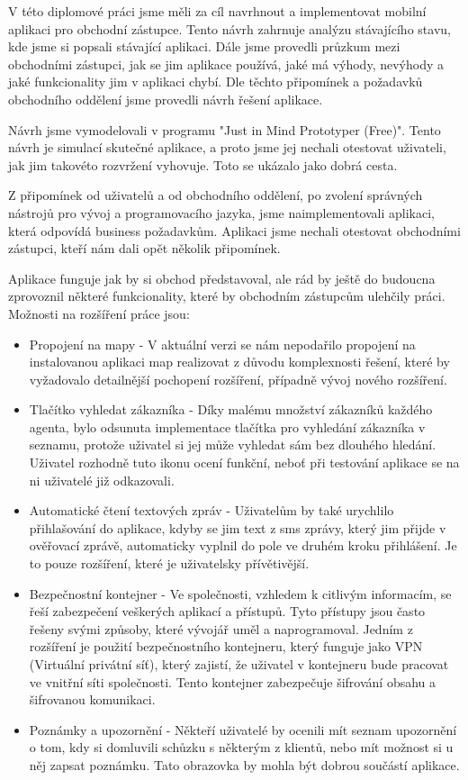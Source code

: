 \documentclass[11pt,twoside,a4paper]{book}
\begin{document}
V této diplomové práci jsme měli za cíl navrhnout a implementovat mobilní aplikaci pro obchodní zástupce. Tento návrh zahrnuje analýzu stávajícího stavu, kde jsme si popsali stávající aplikaci. Dále jsme provedli průzkum mezi obchodními zástupci, jak se jim aplikace používá, jaké má výhody, nevýhody a jaké funkcionality jim v aplikaci chybí. Dle těchto připomínek a požadavků obchodního oddělení jsme provedli návrh řešení aplikace. 

Návrh jsme vymodelovali v programu "Just in Mind Prototyper (Free)". Tento návrh je simulací skutečné aplikace, a proto jsme jej nechali otestovat uživateli, jak jim takovéto rozvržení vyhovuje. Toto se ukázalo jako dobrá cesta. 

Z připomínek od uživatelů a od obchodního oddělení, po zvolení správných nástrojů pro vývoj a programovacího jazyka, jsme naimplementovali aplikaci, která odpovídá business požadavkům. Aplikaci jsme nechali otestovat obchodními zástupci, kteří nám dali opět několik připomínek.

Aplikace funguje jak by si obchod představoval, ale rád by ještě do budoucna zprovoznil některé funkcionality, které by obchodním zástupcům ulehčily práci. Možnosti na rozšíření práce jsou:
\begin{itemize}
	\item Propojení na mapy - V aktuální verzi se nám nepodařilo propojení na instalovanou aplikaci map realizovat z důvodu komplexnosti řešení, které by vyžadovalo detailnější pochopení rozšíření, případně vývoj nového rozšíření. 
	\item Tlačítko vyhledat zákazníka - Díky malému množství zákazníků každého agenta, bylo odsunuta implementace tlačítka pro vyhledání zákazníka v seznamu, protože uživatel si jej může vyhledat sám bez dlouhého hledání. Uživatel rozhodně tuto ikonu ocení funkční, neboť při testování aplikace se na ni uživatelé již odkazovali.
	\item Automatické čtení textových zpráv - Uživatelům by také urychlilo přihlašování do aplikace, kdyby se jim text z sms zprávy, který jim přijde v ověřovací zprávě, automaticky vyplnil do pole ve druhém kroku přihlášení. Je to pouze rozšíření, které je uživatelsky přívětivější.
	\item Bezpečnostní kontejner - Ve společnosti, vzhledem k citlivým informacím, se řeší zabezpečení veškerých aplikací a přístupů. Tyto přístupy jsou často řešeny svými způsoby, které vývojář uměl a naprogramoval. Jedním z rozšíření je použití bezpečnostního kontejneru, který funguje jako VPN (Virtuální privátní síť), který zajistí, že uživatel v kontejneru bude pracovat ve vnitřní síti společnosti. Tento kontejner zabezpečuje šifrování obsahu a šifrovanou komunikaci.
	\item Poznámky a upozornění - Někteří uživatelé by ocenili mít seznam upozornění o tom, kdy si domluvili schůzku s některým z klientů, nebo mít možnost si u něj zapsat poznámku. Tato obrazovka by mohla být dobrou součástí aplikace.
\end{itemize}
\end{document}
